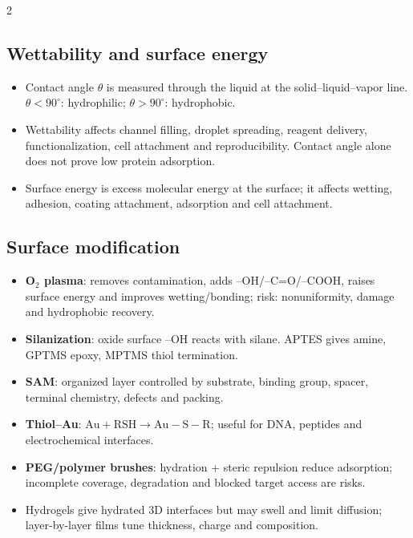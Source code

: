 \documentclass[10pt,a4paper]{ctexart}
\newcommand{\key}[1]{\textbf{#1}}
\begin{document}
\begin{multicols*}{2}
\subsection{Wettability and surface energy}
\begin{itemize}
	\item Contact angle \(\theta\) is measured through the liquid at the solid--liquid--vapor line. \(\theta<90^\circ\): hydrophilic; \(\theta>90^\circ\): hydrophobic.
	\item Wettability affects channel filling, droplet spreading, reagent delivery, functionalization, cell attachment and reproducibility. Contact angle alone does not prove low protein adsorption.
	\item Surface energy is excess molecular energy at the surface; it affects wetting, adhesion, coating attachment, adsorption and cell attachment.
\end{itemize}

\subsection{Surface modification}
\begin{itemize}
	\item \key{O$_2$ plasma}: removes contamination, adds --OH/--C=O/--COOH, raises surface energy and improves wetting/bonding; risk: nonuniformity, damage and hydrophobic recovery.
	\item \key{Silanization}: oxide surface --OH reacts with silane. APTES gives amine, GPTMS epoxy, MPTMS thiol termination.
	\item \key{SAM}: organized layer controlled by substrate, binding group, spacer, terminal chemistry, defects and packing.
	\item \key{Thiol--Au}: \(\mathrm{Au+RSH\rightarrow Au-S-R}\); useful for DNA, peptides and electrochemical interfaces.
	\item \key{PEG/polymer brushes}: hydration + steric repulsion reduce adsorption; incomplete coverage, degradation and blocked target access are risks.
	\item Hydrogels give hydrated 3D interfaces but may swell and limit diffusion; layer-by-layer films tune thickness, charge and composition.
\end{itemize}


\end{multicols*}
\end{document}
